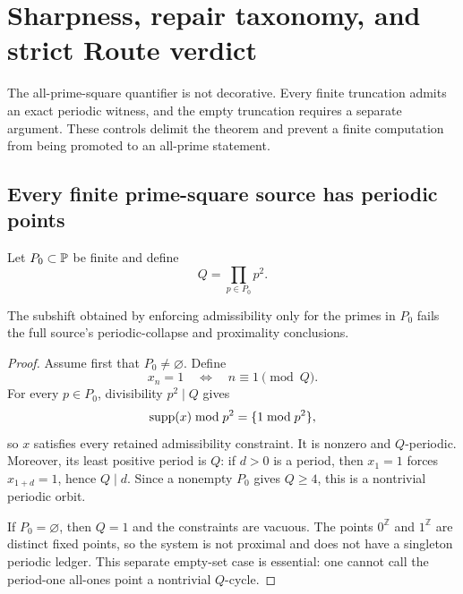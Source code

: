 \section{Sharpness, repair taxonomy, and strict Route verdict}
\label{sec:sharpness-route}

The all-prime-square quantifier is not decorative.  Every finite truncation
admits an exact periodic witness, and the empty truncation requires a separate
argument.  These controls delimit the theorem and prevent a finite
computation from being promoted to an all-prime statement.

\subsection{Every finite prime-square source has periodic points}

Let \(P_0\subset\mathbb P\) be finite and define
\begin{equation}
  Q=\prod_{p\in P_0}p^2.
  \label{eq:finite-Q}
\end{equation}

\begin{proposition}
\label{prop:finite-sharpness}
The subshift obtained by enforcing admissibility only for the primes in
\(P_0\) fails the full source's periodic-collapse and proximality
conclusions.
\end{proposition}

\begin{proof}
Assume first that \(P_0\neq\varnothing\).  Define
\begin{equation}
  x_n=1
  \quad\Longleftrightarrow\quad
  n\equiv1\pmod Q.
  \label{eq:finite-witness}
\end{equation}
For every \(p\in P_0\), divisibility \(p^2\mid Q\) gives
\[
  \operatorname{supp}(x)\bmod p^2=\{1\bmod p^2\},
\]
so \(x\) satisfies every retained admissibility constraint.  It is nonzero
and \(Q\)-periodic.  Moreover, its least positive period is \(Q\): if
\(d>0\) is a period, then \(x_1=1\) forces \(x_{1+d}=1\), hence
\(Q\mid d\).  Since a nonempty \(P_0\) gives \(Q\geq4\), this is a
nontrivial periodic orbit.

If \(P_0=\varnothing\), then \(Q=1\) and the constraints are vacuous.
The points \(0^{\mathbb Z}\) and \(1^{\mathbb Z}\) are distinct fixed
points, so the system is not proximal and does not have a singleton periodic
ledger.  This separate empty-set case is essential: one cannot call the
period-one all-ones point a nontrivial \(Q\)-cycle.
\end{proof}

